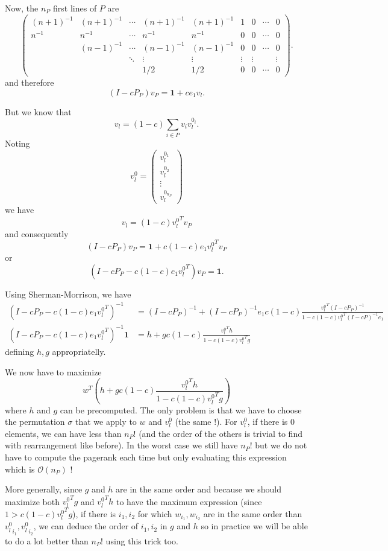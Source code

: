 \documentclass{article}
\newcommand{\bigoh}{\mathcal{O}}
\newcommand{\1}{\mathbf{1}}
\theoremstyle{definition}
\begin{document}
Now, the $n_P$ first lines of $P$ are
\[
  \begin{pmatrix}
    (n+1)^{-1} & (n+1)^{-1} & \cdots & (n+1)^{-1} & (n+1)^{-1} & 1 & 0 & \cdots & 0\\
    n^{-1} & n^{-1} & \cdots & n^{-1} & n^{-1} & 0 & 0 & \cdots & 0\\
           & (n-1)^{-1} & \cdots & (n-1)^{-1} & (n-1)^{-1} & 0 & 0 & \cdots & 0\\
           & & \ddots & \vdots & \vdots & \vdots & \vdots & & \vdots \\
           & & & 1/2 & 1/2 & 0 & 0 & \cdots & 0
  \end{pmatrix}.
\]
and therefore
\[ (I - cP_P)v_P = \1 + c e_1 v_l. \]

But we know that
\[ v_l = (1-c) \sum_{i \in P} v_i v_l^{0_i}. \]
Noting
\[ v_l^0 =
  \begin{pmatrix}
    v_l^{0_1} \\ v_l^{0_2} \\ \vdots \\ v_l^{0_{n_P}}
  \end{pmatrix}
\]
we have
\[ v_l = (1-c) {v_l^0}^T v_P \]
and consequently
\[ (I - cP_P)v_P = \1 + c (1-c) e_1 {v_l^0}^T v_P \]
or
\[ (I - cP_P - c (1-c) e_1 {v_l^0}^T)v_P = \1. \]

Using Sherman-Morrison, we have
\begin{align*}
  (I - cP_P - c (1-c) e_1 {v_l^0}^T)^{-1} & = (I - cP_P)^{-1} + (I - cP_P)^{-1}e_1 c(1-c) \frac{{v_l^0}^T(I-cP_P)^{-1}}{1 - c(1-c){v_l^0}^T(I-cP)^{-1}e_1}\\
  (I - cP_P - c (1-c) e_1 {v_l^0}^T)^{-1}\1 & = h + g c(1-c) \frac{{v_l^0}^Th}{1 - c(1-c){v_l^0}^Tg}
\end{align*}
defining $h,g$ appropriatelly.

We now have to maximize
\[ w^T \left(h + g c(1-c) \frac{{v_l^0}^Th}{1 - c(1-c){v_l^0}^Tg}\right) \]
where $h$ and $g$ can be precomputed.
The only problem is that we have to choose the permutation $\sigma$ that we apply to $w$ and $v_l^0$ (the same !).
For $v_l^0$, if there is 0 elements, we can have less than $n_P!$ (and the order of the others is trivial to find with rearrangement like before).
In the worst case we still have $n_P!$ but we do not have to compute the pagerank each time but only evaluating this expression which is $\bigoh(n_P)$ !

More generally, since $g$ and $h$ are in the same order  and because we should maximize both ${v_l^0}^Tg$ and ${v_l^0}^Th$ to have the maximum expression (since $1 > c(1-c){v_l^0}^Tg$),
if there is $i_1, i_2$ for which $w_{i_1}, w_{i_2}$ are in the same order than ${v_l^0}_{i_1}, {v_l^0}_{i_2}$,
we can deduce the order of $i_1, i_2$ in $g$ and $h$ so in practice we will be able to do a lot better than $n_P!$ using this trick too.
\end{document}
